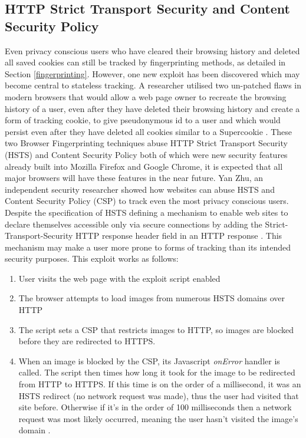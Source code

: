 \documentclass[12pt]{article}
\begin{document}
\subsection{HTTP Strict Transport Security and Content Security Policy}
Even privacy conscious users who have cleared their browsing history and deleted all saved cookies can still be tracked by fingerprinting methods, as detailed in Section \ref{fingerprinting}. However, one new exploit has been discovered which may become central to stateless tracking. A researcher utilised two un-patched flaws in modern browsers that would allow a web page owner to recreate the browsing history of a user, even after they have deleted their browsing history and create a form of tracking cookie, to give pseudonymous id to a user and which would persist even after they have deleted all cookies similar to a Supercookie \parencite{newTracking}. These two Browser Fingerprinting techniques abuse HTTP Strict Transport Security (HSTS) and Content Security Policy both of which were new security features already built into Mozilla Firefox and Google Chrome, it is expected that all major browsers will have these features in the near future. Yan Zhu, an independent security researcher showed how websites can abuse HSTS and Content Security Policy (CSP) to track even the most privacy conscious users. Despite the specification of HSTS defining a mechanism to enable web sites to declare themselves accessible only via secure connections by adding the Strict-Transport-Security HTTP response header field in an HTTP response \parencite{HSTS}. This mechanism may make a user more prone to forms of tracking than its intended security purposes. This exploit works as follows: 

\begin{enumerate}
    \item User visits the web page with the exploit script enabled
    \item The browser attempts to load images from numerous HSTS domains over HTTP
    \item The script sets a CSP that restricts images to HTTP, so images are blocked before they are redirected to HTTPS. 
    \item When an image is blocked by the CSP, its Javascript \textit{onError} handler is called. The script then times how long it took for the image to be redirected from HTTP to HTTPS. If this time is on the order of a millisecond, it was an HSTS redirect (no network request was made), thus the user had visited that site before. Otherwise if it's in the order of 100 milliseconds then a network request was most likely occurred, meaning the user hasn't visited the image's domain \parencite{gitSniffly}. 
\end{enumerate} 
\end{document}
